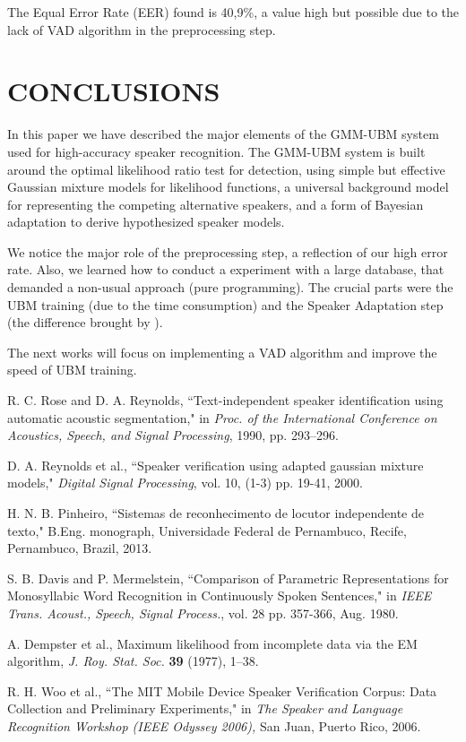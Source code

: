 \documentclass[a4paper,twocolumn]{article}
\begin{document}
\noindent The Equal Error Rate (EER) found is 40,9\%, a value high but possible due to the lack of VAD algorithm in the preprocessing step.


\section{CONCLUSIONS}

In this paper we have described the major elements of the GMM-UBM system used for high-accuracy speaker recognition. The GMM-UBM system is built around the optimal likelihood ratio test for detection, using simple but effective Gaussian mixture models for likelihood functions, a universal background model for representing the competing alternative speakers, and a form of Bayesian adaptation to derive hypothesized speaker models.

We notice the major role of the preprocessing step, a reflection of our high error rate. Also, we learned how to conduct a experiment with a large database, that demanded a non-usual approach (pure programming). The crucial parts were the UBM training (due to the time consumption) and the Speaker Adaptation step (the difference brought by \cite{reynolds_et_al_2000}).

The next works will focus on implementing a VAD algorithm and improve the speed of UBM training.


\begin{thebibliography}{9}
        R. C. Rose and D. A. Reynolds,
        ``Text-independent speaker identification using automatic acoustic segmentation,"
        in \textit{Proc. of the International Conference on Acoustics, Speech, and
        Signal Processing},
        1990,
        pp. 293–296.

        D. A. Reynolds et al.,
        ``Speaker verification using adapted gaussian mixture models,"
        \textit{Digital Signal Processing}, vol. 10,
        (1-3) pp. 19-41,
        2000.

        H. N. B. Pinheiro,
        ``Sistemas de reconhecimento de locutor independente de texto,"
        B.Eng. monograph, Universidade Federal de Pernambuco,
        Recife, Pernambuco, Brazil,
        2013.

        S. B. Davis and P. Mermelstein,
        ``Comparison of Parametric Representations for Monosyllabic Word Recognition in Continuously Spoken Sentences,"
        in \textit{IEEE Trans. Acoust., Speech, Signal Process.},
        vol. 28
        pp. 357-366,
        Aug. 1980.

        A. Dempster et al.,
        Maximum likelihood from incomplete data via the EM algorithm,
        \textit{J. Roy. Stat. Soc.} \textbf{39} (1977), 1–38.

        R. H. Woo et al.,
        ``The MIT Mobile Device Speaker Verification Corpus: Data Collection and Preliminary Experiments,"
        in \textit{The Speaker and Language Recognition Workshop (IEEE Odyssey 2006),}
        San Juan, Puerto Rico, 2006.

\end{thebibliography}
\end{document}
